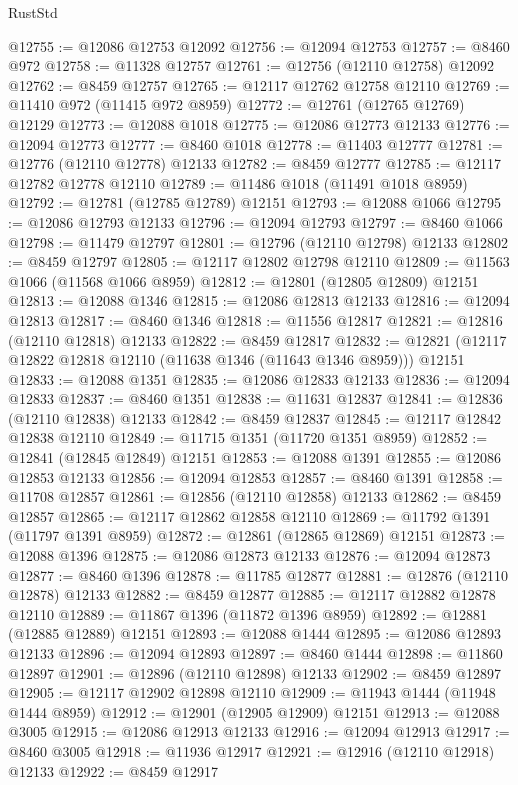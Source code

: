 \begin{lexlean}{RustStd}
\begin{coremodule}
@12755 := @12086 @12753 @12092
@12756 := @12094 @12753
@12757 := @8460 @972
@12758 := @11328 @12757
@12761 := @12756 (@12110 @12758) @12092
@12762 := @8459 @12757
@12765 := @12117 @12762 @12758 @12110
@12769 := @11410 @972 (@11415 @972 @8959)
@12772 := @12761 (@12765 @12769) @12129
@12773 := @12088 @1018
@12775 := @12086 @12773 @12133
@12776 := @12094 @12773
@12777 := @8460 @1018
@12778 := @11403 @12777
@12781 := @12776 (@12110 @12778) @12133
@12782 := @8459 @12777
@12785 := @12117 @12782 @12778 @12110
@12789 := @11486 @1018 (@11491 @1018 @8959)
@12792 := @12781 (@12785 @12789) @12151
@12793 := @12088 @1066
@12795 := @12086 @12793 @12133
@12796 := @12094 @12793
@12797 := @8460 @1066
@12798 := @11479 @12797
@12801 := @12796 (@12110 @12798) @12133
@12802 := @8459 @12797
@12805 := @12117 @12802 @12798 @12110
@12809 := @11563 @1066 (@11568 @1066 @8959)
@12812 := @12801 (@12805 @12809) @12151
@12813 := @12088 @1346
@12815 := @12086 @12813 @12133
@12816 := @12094 @12813
@12817 := @8460 @1346
@12818 := @11556 @12817
@12821 := @12816 (@12110 @12818) @12133
@12822 := @8459 @12817
@12832 := @12821 (@12117 @12822 @12818 @12110 (@11638 @1346 (@11643 @1346 @8959))) @12151
@12833 := @12088 @1351
@12835 := @12086 @12833 @12133
@12836 := @12094 @12833
@12837 := @8460 @1351
@12838 := @11631 @12837
@12841 := @12836 (@12110 @12838) @12133
@12842 := @8459 @12837
@12845 := @12117 @12842 @12838 @12110
@12849 := @11715 @1351 (@11720 @1351 @8959)
@12852 := @12841 (@12845 @12849) @12151
@12853 := @12088 @1391
@12855 := @12086 @12853 @12133
@12856 := @12094 @12853
@12857 := @8460 @1391
@12858 := @11708 @12857
@12861 := @12856 (@12110 @12858) @12133
@12862 := @8459 @12857
@12865 := @12117 @12862 @12858 @12110
@12869 := @11792 @1391 (@11797 @1391 @8959)
@12872 := @12861 (@12865 @12869) @12151
@12873 := @12088 @1396
@12875 := @12086 @12873 @12133
@12876 := @12094 @12873
@12877 := @8460 @1396
@12878 := @11785 @12877
@12881 := @12876 (@12110 @12878) @12133
@12882 := @8459 @12877
@12885 := @12117 @12882 @12878 @12110
@12889 := @11867 @1396 (@11872 @1396 @8959)
@12892 := @12881 (@12885 @12889) @12151
@12893 := @12088 @1444
@12895 := @12086 @12893 @12133
@12896 := @12094 @12893
@12897 := @8460 @1444
@12898 := @11860 @12897
@12901 := @12896 (@12110 @12898) @12133
@12902 := @8459 @12897
@12905 := @12117 @12902 @12898 @12110
@12909 := @11943 @1444 (@11948 @1444 @8959)
@12912 := @12901 (@12905 @12909) @12151
@12913 := @12088 @3005
@12915 := @12086 @12913 @12133
@12916 := @12094 @12913
@12917 := @8460 @3005
@12918 := @11936 @12917
@12921 := @12916 (@12110 @12918) @12133
@12922 := @8459 @12917

\end{coremodule}
\end{lexlean}
